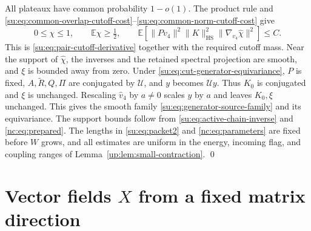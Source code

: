 \documentclass[11pt]{article}
\numberwithin{equation}{section}
\theoremstyle{remark}
\newcommand{\E}{\mathbb E}
\newcommand{\HS}{\mathrm{HS}}
\begin{document}
All plateaux have common probability $1-o(1)$. The product rule and
\eqref{su:eq:common-overlap-cutoff-cost}--\eqref{su:eq:common-norm-cutoff-cost}
give
\begin{equation}\label{su:eq:construction-cutoff-goals}
 0\le\chi\le1,\qquad \E\chi\ge\tfrac12,\qquad
 \E\left[\|Pv_4\|^2\|K\|_{\HS}^2
       \|\nabla_{v_4}\widehat\chi\|^2\right]\le C.
\end{equation}
This is \eqref{su:eq:pair-cutoff-derivative} together with the required
cutoff mass. Near the support of $\widehat\chi$, the inverses and the
retained spectral projection are smooth, and $\xi$ is bounded away from zero.
Under \eqref{su:eq:cut-generator-equivariance}, $P$ is fixed,
$A,\widetilde R,Q,\Pi$ are conjugated by $\mathcal U$, and $y$ becomes
$\mathcal U y$. Thus $K_0$ is conjugated and $\xi$ is unchanged.
Rescaling $\widehat v_4$ by $a\ne0$ scales $y$ by $a$ and leaves
$K_0,\xi$ unchanged. This gives the smooth family
\eqref{su:eq:generator-source-family} and its equivariance.
The support bounds follow from \eqref{su:eq:active-chain-inverse} and
\eqref{nc:eq:prepared}. The lengths in \eqref{su:eq:packet2} and
\eqref{nc:eq:parameters} are fixed before $W$ grows, and all estimates
are uniform in the energy, incoming flag, and coupling ranges of
Lemma~\ref{up:lem:small-contraction}. \qed


\section{Vector fields \texorpdfstring{$X$}{X} from a fixed matrix direction}
\label{sec:compact-proof}
\end{document}
